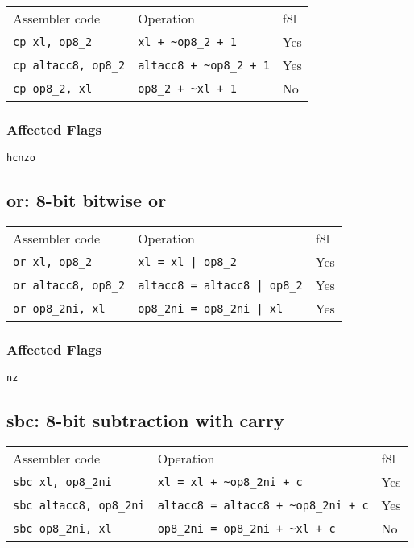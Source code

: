 \documentclass{book}
\begin{document}
\begin{tabular}{l l l}
Assembler code              & Operation                         & f8l\\
\texttt{cp xl, op8\_2}      & \texttt{xl + \~{}op8\_2 + 1}      & Yes \\
\texttt{cp altacc8, op8\_2} & \texttt{altacc8 + \~{}op8\_2 + 1} & Yes \\
\texttt{cp op8\_2, xl}      & \texttt{op8\_2 + \~{}xl + 1}      & No
\end{tabular}

\subsubsection*{Affected Flags}

\texttt{hcnzo}


\subsection{or: 8-bit bitwise or}

\begin{tabular}{l l l}
Assembler code              & Operation                           & f8l \\
\texttt{or xl, op8\_2}      & \texttt{xl = xl | op8\_2}           & Yes \\
\texttt{or altacc8, op8\_2} & \texttt{altacc8 = altacc8 | op8\_2} & Yes \\
\texttt{or op8\_2ni, xl}    & \texttt{op8\_2ni = op8\_2ni | xl}   & Yes
\end{tabular}

\subsubsection*{Affected Flags}

\texttt{nz}


\subsection{sbc: 8-bit subtraction with carry}

\begin{tabular}{l l l}
Assembler code                 & Operation                                     & f8l \\
\texttt{sbc xl, op8\_2ni}      & \texttt{xl = xl + \~{}op8\_2ni + c}           & Yes \\
\texttt{sbc altacc8, op8\_2ni} & \texttt{altacc8 = altacc8 + \~{}op8\_2ni + c} & Yes \\
\texttt{sbc op8\_2ni, xl}      & \texttt{op8\_2ni = op8\_2ni + \~{}xl + c}     & No
\end{tabular}
\end{document}
